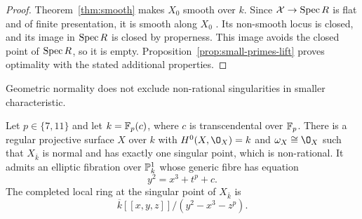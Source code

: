 \begin{proof}
Theorem~\ref{thm:smooth} makes $X_0$ smooth over $k$.
Since $\mathcal X\to\operatorname{Spec} R$ is flat and of finite presentation, it is smooth along $X_0$ \cite[Definition~4.3.35]{Liu02}.
Its non-smooth locus is closed, and its image in $\operatorname{Spec} R$ is closed by properness.
This image avoids the closed point of $\operatorname{Spec} R$, so it is empty.
Proposition~\ref{prop:small-primes-lift} proves optimality with the stated additional properties.
\end{proof}

Geometric normality does not exclude non-rational singularities in smaller characteristic.

\begin{example}\label{ex:nonrational-small-primes}
Let $p\in\{7,11\}$ and let $k = \mathbb{F}_p(c)$, where $c$ is transcendental over $\mathbb{F}_p$.
There is a regular projective surface $X$ over $k$ with $H^0(X,\O_X) = k$ and $\omega_X\cong\O_X$ such that $X_{\bar k}$ is normal and has exactly one singular point, which is non-rational.
It admits an elliptic fibration over $\mathbb{P}^1_k$ whose generic fibre has equation
\begin{equation}\label{eq:nonrational-small-primes}
  y^2 = x^3+t^p+c.
\end{equation}
The completed local ring at the singular point of $X_{\bar k}$ is
\[
  \overline k[[x,y,z]]/(y^2-x^3-z^p).
\]
\end{example}

